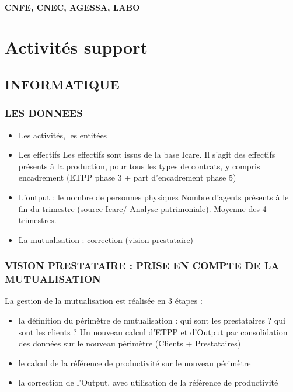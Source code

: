 \documentclass[
]{book}
\begin{document}
\hypertarget{cnfe-cnec-agessa-labo}{%
\subsection{CNFE, CNEC, AGESSA, LABO}\label{cnfe-cnec-agessa-labo}}

\hypertarget{part-activituxe9s-support}{%
\part{Activités support}\label{part-activituxe9s-support}}

\hypertarget{informatique}{%
\chapter{INFORMATIQUE}\label{informatique}}

\hypertarget{les-donnees-12}{%
\section{LES DONNEES}\label{les-donnees-12}}

\begin{itemize}
\item
  Les activités, les entitées
\item
  Les effectifs
  Les effectifs sont issus de la base Icare.
  Il s'agit des effectifs présents à la production, pour tous les types de contrats, y compris encadrement (ETPP phase 3 + part d'encadrement phase 5)
\item
  L'output : le nombre de personnes physiques
  Nombre d'agents présents à le fin du trimestre (source Icare/ Analyse patrimoniale). Moyenne des 4 trimestres.
\item
  La mutualisation : correction (vision prestataire)
\end{itemize}

\hypertarget{vision-prestataire-prise-en-compte-de-la-mutualisation-1}{%
\section{VISION PRESTATAIRE : PRISE EN COMPTE DE LA MUTUALISATION}\label{vision-prestataire-prise-en-compte-de-la-mutualisation-1}}

La gestion de la mutualisation est réalisée en 3 étapes :

\begin{itemize}
\item
  la définition du périmètre de mutualisation : qui sont les prestataires ? qui sont les clients ? Un nouveau calcul d'ETPP et d'Output par consolidation des données sur le nouveau périmètre (Clients + Prestataires)
\item
  le calcul de la référence de productivité sur le nouveau périmètre
\item
  la correction de l'Output, avec utilisation de la référence de productivité
\end{itemize}
\end{document}
